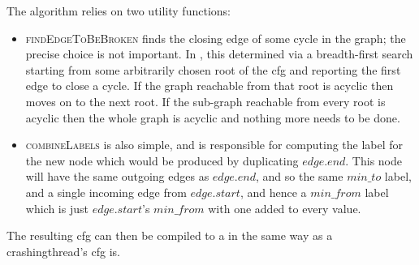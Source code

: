 The algorithm relies on two utility functions:
\begin{itemize}
\item \textsc{findEdgeToBeBroken} finds the closing edge of some cycle
  in the graph; the precise choice is not important.  In
  {\implementation}, this determined via a breadth-first search
  starting from some arbitrarily chosen root of the \gls{cfg} and
  reporting the first edge to close a cycle.  If the graph reachable
  from that root is acyclic then {\implementation} moves on to the
  next root.  If the sub-graph reachable from every root is acyclic
  then the whole graph is acyclic and nothing more needs to be done.
\item \textsc{combineLabels} is also simple, and is responsible for
  computing the label for the new node which would be produced by
  duplicating $\mathit{edge}.\mathit{end}$.  This node will have the
  same outgoing edges as $\mathit{edge}.\mathit{end}$, and so the same
  $min\_to$ label, and a single incoming edge from
  $\mathit{edge}.\mathit{start}$, and hence a $\mathit{min\_from}$
  label which is just $\mathit{edge}.\mathit{start}$'s
  $\mathit{min\_from}$ with one added to every value.
\end{itemize}
The resulting \gls{cfg} can then be compiled to a {\StateMachine} in
the same way as a \gls{crashingthread}'s \gls{cfg} is.

